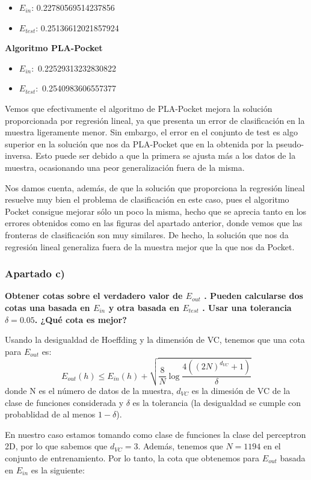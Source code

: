 \documentclass[a4]{article}
\begin{document}
\begin{itemize}
	\item $E_{in}$: 0.22780569514237856
	\item $E_{test}$:  0.25136612021857924	
\end{itemize}

\textbf{Algoritmo PLA-Pocket}
\begin{itemize}
	\item $E_{in}:$ 0.22529313232830822
	\item $E_{test}:$ 0.2540983606557377
\end{itemize}

Vemos que efectivamente el algoritmo de PLA-Pocket mejora la solución proporcionada por regresión lineal, ya que presenta un error de clasificación en la muestra ligeramente menor.  Sin embargo, el error en el conjunto de test es algo superior en la solución que nos da PLA-Pocket que en la obtenida por la pseudo-inversa. Esto puede ser debido a que la primera se ajusta más a los datos de la muestra, ocasionando una peor generalización fuera de la misma.

Nos damos cuenta, además, de que la solución que proporciona la regresión lineal resuelve muy bien el problema de clasificación en este caso, pues el algoritmo Pocket consigue mejorar sólo un poco la misma, hecho que se aprecia tanto en los errores obtenidos como en las figuras del apartado anterior, donde vemos que las fronteras de clasificación son muy similares. De hecho, la solución que nos da regresión lineal generaliza fuera de la muestra mejor que la que nos da Pocket.

\subsubsection{Apartado c)}

\textbf{Obtener cotas sobre el verdadero valor de $E_{out}$ . Pueden calcularse dos cotas una
basada en $E_{in}$ y otra basada en $E_{test}$ . Usar una tolerancia $\delta = 0.05$. ¿Qué cota es
mejor?}

Usando la desigualdad de Hoeffding y la dimensión de VC, tenemos que una cota para $E_{out}$ es:
$$E_{out}(h)\leq E_{in}(h) + \sqrt{\frac{8}{N}\log\frac{4((2N)^{d_{VC}}+1)}{\delta}}$$
donde N es el número de datos de la muestra, $d_{VC}$ es la dimesión de VC de la clase de funciones considerada y $\delta$ es la tolerancia (la desigualdad se cumple con probablidad de al menos $1-\delta$).

En nuestro caso estamos tomando como clase de funciones la clase del perceptron 2D, por lo que sabemos que $d_{VC}=3$. Además, tenemos que $N=1194$ en el conjunto de entrenamiento. Por lo tanto, la cota que obtenemos para $E_{out}$ basada en $E_{in}$ es la siguiente:
\end{document}
